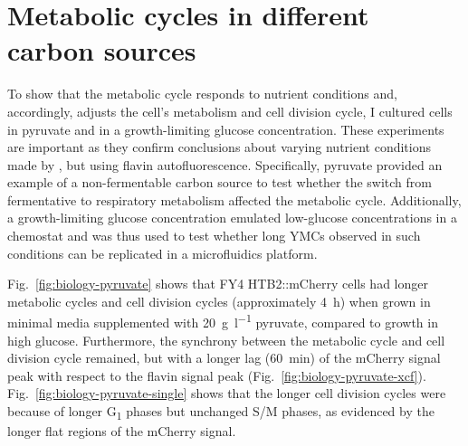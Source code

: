 \section{Metabolic cycles in different carbon sources}
\label{sec:biology-carbon}

To show that the metabolic cycle responds to nutrient conditions and, accordingly, adjusts the cell's metabolism and cell division cycle, I cultured cells in pyruvate and in a growth-limiting glucose concentration.
These experiments are important as they confirm conclusions about varying nutrient conditions made by \textcite{papagiannakisAutonomousMetabolicOscillations2017},
but using flavin autofluorescence.
Specifically, pyruvate provided an example of a non-fermentable carbon source to test whether the switch from fermentative to respiratory metabolism affected the metabolic cycle.
Additionally, a growth-limiting glucose concentration emulated low-glucose concentrations in a chemostat and was thus used to test whether long YMCs observed in such conditions can be replicated in a microfluidics platform.

Fig.\ \ref{fig:biology-pyruvate} shows that FY4 HTB2::mCherry cells had longer metabolic cycles and cell division cycles (approximately \SI{4}{\hour}) when grown in minimal media supplemented with \SI{20}{\gram~\litre^{-1}} pyruvate, compared to growth in high glucose.
Furthermore, the synchrony between the metabolic cycle and cell division cycle remained, but with a longer lag (\SI{60}{\minute}) of the mCherry signal peak with respect to the flavin signal peak (Fig.\ \ref{fig:biology-pyruvate-xcf}).
Fig.\ \ref{fig:biology-pyruvate-single} shows that the longer cell division cycles were because of longer G\textsubscript{1} phases but unchanged S/M phases, as evidenced by the longer flat regions of the mCherry signal.

